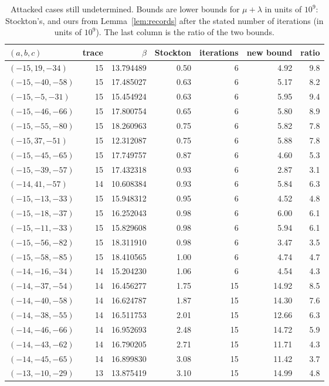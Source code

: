 \documentclass[11pt]{amsart}
\theoremstyle{definition}
\theoremstyle{remark}
\begin{document}
\begin{table}[ht]
\centering\small
\caption{Attacked cases still undetermined. Bounds are lower bounds for $\mu+\lambda$ in units of $10^9$: Stockton's, and ours from Lemma~\ref{lem:records} after the stated number of iterations (in units of $10^9$). The last column is the ratio of the two bounds.}\label{tab:bounds}
\begin{tabular}{@{}lrrrrrr@{}}
\toprule
$(a,b,c)$ & trace & $\beta$ & Stockton & iterations & new bound & ratio\\
\midrule
$(-15,19,-34)$ & 15 & 13.794489 & 0.50 & 6 & 4.92 & 9.8\\
$(-15,-40,-58)$ & 15 & 17.485027 & 0.63 & 6 & 5.17 & 8.2\\
$(-15,-5,-31)$ & 15 & 15.454924 & 0.63 & 6 & 5.95 & 9.4\\
$(-15,-46,-66)$ & 15 & 17.800754 & 0.65 & 6 & 5.80 & 8.9\\
$(-15,-55,-80)$ & 15 & 18.260963 & 0.75 & 6 & 5.82 & 7.8\\
$(-15,37,-51)$ & 15 & 12.312087 & 0.75 & 6 & 5.88 & 7.8\\
$(-15,-45,-65)$ & 15 & 17.749757 & 0.87 & 6 & 4.60 & 5.3\\
$(-15,-39,-57)$ & 15 & 17.432318 & 0.93 & 6 & 2.87 & 3.1\\
$(-14,41,-57)$ & 14 & 10.608384 & 0.93 & 6 & 5.84 & 6.3\\
$(-15,-13,-33)$ & 15 & 15.948312 & 0.95 & 6 & 4.52 & 4.8\\
$(-15,-18,-37)$ & 15 & 16.252043 & 0.98 & 6 & 6.00 & 6.1\\
$(-15,-11,-33)$ & 15 & 15.829608 & 0.98 & 6 & 5.94 & 6.1\\
$(-15,-56,-82)$ & 15 & 18.311910 & 0.98 & 6 & 3.47 & 3.5\\
$(-15,-58,-85)$ & 15 & 18.410565 & 1.00 & 6 & 4.74 & 4.7\\
$(-14,-16,-34)$ & 14 & 15.204230 & 1.06 & 6 & 4.54 & 4.3\\
$(-14,-37,-54)$ & 14 & 16.456277 & 1.75 & 15 & 14.92 & 8.5\\
$(-14,-40,-58)$ & 14 & 16.624787 & 1.87 & 15 & 14.30 & 7.6\\
$(-14,-38,-55)$ & 14 & 16.511753 & 2.01 & 15 & 12.66 & 6.3\\
$(-14,-46,-66)$ & 14 & 16.952693 & 2.48 & 15 & 14.72 & 5.9\\
$(-14,-43,-62)$ & 14 & 16.790205 & 2.71 & 15 & 11.71 & 4.3\\
$(-14,-45,-65)$ & 14 & 16.899830 & 3.08 & 15 & 11.42 & 3.7\\
$(-13,-10,-29)$ & 13 & 13.875419 & 3.10 & 15 & 14.99 & 4.8\\
\bottomrule
\end{tabular}
\end{table}
\end{document}
